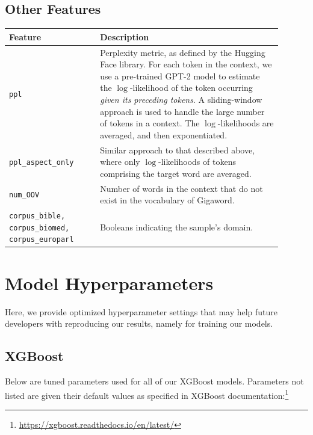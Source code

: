 \documentclass{dcthesis}
\theoremstyle{definition}
\theoremstyle{remark}
\begin{document}
\section{Other Features}

\begin{table}[H]
  \centering
  \begin{tabular}{>{\centering\arraybackslash}p{0.3\linewidth}>{\arraybackslash}p{0.6\linewidth}}
    \textbf{Feature} & \textbf{Description} \\ \hline 
    \texttt{ppl} & Perplexity metric, as defined by the Hugging Face library.\tablefootnote{\url{https://huggingface.co/transformers/perplexity.html}} For each token in the context, we use a pre-trained GPT-2 model to estimate the $\log$-likelihood of the token occurring \textit{given its preceding tokens}. A sliding-window approach is used to handle the large number of tokens in a context. The $\log$-likelihoods are averaged, and then exponentiated.\\
    \hline 
    \texttt{ppl\_aspect\_only} & Similar approach to that described above, where only $\log$-likelihoods of tokens comprising the target word are averaged.\\
    \hline 
    \texttt{num\_OOV} & Number of words in the context that do not exist in the vocabulary of Gigaword.\\
    \hline 
    \texttt{corpus\_bible, corpus\_biomed, corpus\_europarl} & Booleans indicating the sample's domain.\\
  \end{tabular}
  \label{other_features}
\end{table}

\chapter{Model Hyperparameters}

Here, we provide optimized hyperparameter settings that may help future developers with reproducing our results, namely for training our models.

\section{XGBoost}
\label{appendix:xgboost_hyperparameters}

Below are tuned parameters used for all of our XGBoost models. Parameters not listed are given their default values as specified in XGBoost documentation:\footnote{\url{https://xgboost.readthedocs.io/en/latest/}}
\end{document}
